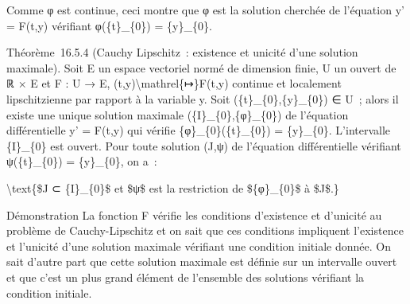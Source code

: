 \documentclass[]{article}
\begin{document}
Comme φ est continue, ceci montre que φ est la solution cherchée de
l'équation y' = F(t,y) vérifiant φ(\{t\}\_\{0\}) = \{y\}\_\{0\}.

Théorème~16.5.4 (Cauchy Lipschitz~: existence et unicité d'une solution
maximale). Soit E un espace vectoriel normé de dimension finie, U un
ouvert de ℝ × E et F : U → E, (t,y)\textbackslash{}mathrel\{↦\}F(t,y)
continue et localement lipschitzienne par rapport à la variable y. Soit
(\{t\}\_\{0\},\{y\}\_\{0\}) ∈ U~; alors il existe une unique solution
maximale (\{I\}\_\{0\},\{φ\}\_\{0\}) de l'équation différentielle y' =
F(t,y) qui vérifie \{φ\}\_\{0\}(\{t\}\_\{0\}) = \{y\}\_\{0\}.
L'intervalle \{I\}\_\{0\} est ouvert. Pour toute solution (J,ψ) de
l'équation différentielle vérifiant ψ(\{t\}\_\{0\}) = \{y\}\_\{0\}, on
a~:

\textbackslash{}text\{\$J ⊂ \{I\}\_\{0\}\$ et \$ψ\$ est la restriction
de \$\{φ\}\_\{0\}\$ à \$J\$.\}

Démonstration La fonction F vérifie les conditions d'existence et
d'unicité au problème de Cauchy-Lipschitz et on sait que ces conditions
impliquent l'existence et l'unicité d'une solution maximale vérifiant
une condition initiale donnée. On sait d'autre part que cette solution
maximale est définie sur un intervalle ouvert et que c'est un plus grand
élément de l'ensemble des solutions vérifiant la condition initiale.
\end{document}
